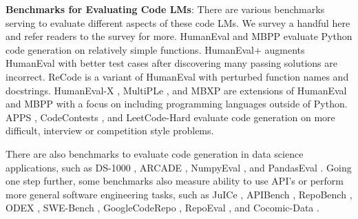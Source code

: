 \documentclass{article} %
\begin{document}
\noindent \textbf{Benchmarks for Evaluating Code LMs}: There are various benchmarks serving to evaluate different aspects of these code LMs. We survey a handful here and refer readers to the survey \citep{zhang2023survey} for more. HumanEval \citep{chen2021evaluating} and MBPP \citep{austin2021program} evaluate Python code generation on relatively simple functions. HumanEval+ \citep{liu2023your} augments HumanEval with better test cases after discovering many passing solutions are incorrect. 
ReCode \citep{wang2022recode} is a variant of HumanEval with perturbed function names and docstrings. HumanEval-X  \citep{zheng2023codegeex}, MultiPLe \citep{cassano2022multipl}, and MBXP \citep{athiwaratkun2022multi} are extensions of HumanEval and MBPP with a focus on including programming languages outside of Python. APPS \citep{hendrycks2021measuring}, CodeContests \citep{li2022competition}, and LeetCode-Hard \citep{shinn2023reflexion} evaluate code generation on more difficult, interview or competition style problems.

There are also benchmarks to evaluate code generation in data science applications, such as DS-1000 \citep{lai2023ds}, ARCADE \citep{yin2022natural}, NumpyEval \citep{zhang2023toolcoder}, and PandasEval \citep{jain2022jigsaw}. Going one step further, some benchmarks also measure ability to use API's or perform more general software engineering tasks, such as JuICe \citep{agashe2019juice}, APIBench \citep{patil2023gorilla}, RepoBench \citep{liu2023repobench}, ODEX \citep{wang2022execution}, SWE-Bench \citep{jimenez2023swe}, GoogleCodeRepo \citep{shrivastava2023repository}, RepoEval \citep{zhang2023repocoder}, and Cocomic-Data \citep{ding2022cocomic}.

\end{document}
